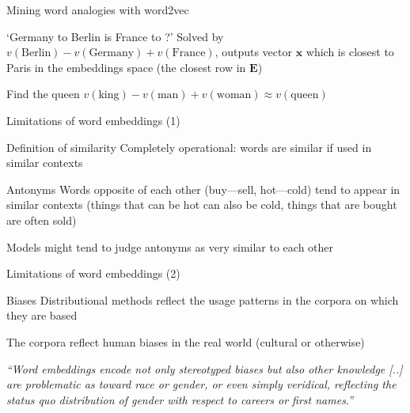 \documentclass[12pt,aspectratio=169,handout]{beamer}
\begin{document}
\begin{frame}{Mining word analogies with word2vec}

\begin{block}{`Germany to Berlin is France to ?'}
Solved by $v(\text{Berlin}) - v(\text{Germany}) + v(\text{France})$, outputs vector $\bm{x}$ which is closest to Paris in the embeddings space (the closest row in $\bm{E}$)
\end{block}

\begin{block}{Find the queen}
$v(\text{king}) - v(\text{man}) + v(\text{woman}) \approx v(\text{queen})$
\end{block}


\end{frame}

\begin{frame}{Limitations of word embeddings (1)}

\begin{block}{Definition of similarity}
Completely operational: words are similar if used in similar contexts
\end{block}

\begin{block}{Antonyms}
Words opposite of each other (buy---sell, hot---cold) tend to appear in similar contexts (things that can be hot can also be cold, things that are bought are often sold)

Models might tend to judge antonyms as very similar to each other
\end{block}

\end{frame}

\begin{frame}{Limitations of word embeddings (2)}

\begin{block}{Biases}
Distributional methods reflect the usage patterns in the corpora on which they are based

The corpora reflect human biases in the real world (cultural or otherwise)
	
\emph{``Word embeddings encode not only stereotyped biases but also other knowledge
[..] are problematic as toward race or gender, or even simply veridical, reflecting the status quo distribution of gender with respect to careers or first names.''}
\end{block}



\end{frame}
\end{document}
